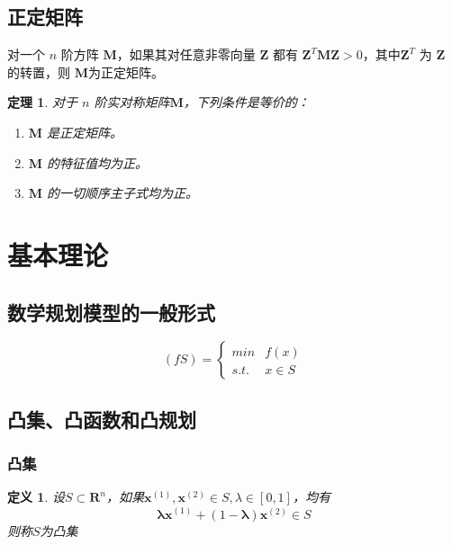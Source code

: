 \documentclass{book}
\newtheorem{theorem}{定理}[chapter]
\newtheorem{definition}{\indent 定义}[chapter]
\begin{document}
\subsection{正定矩阵}

对一个 $n$ 阶方阵 $\boldsymbol{M}$，如果其对任意非零向量 $\boldsymbol{Z}$ 都有 $\boldsymbol{Z}^T\boldsymbol{MZ}>0$，其中$\boldsymbol{Z}^T$ 为 $\boldsymbol{Z}$ 的转置，则 $\boldsymbol{M}$为正定矩阵。
\begin{theorem}
    对于 $n$ 阶实对称矩阵$\boldsymbol{M}$，下列条件是等价的：
    \begin{enumerate}
        \item $\boldsymbol{M}$ 是正定矩阵。
        \item $\boldsymbol{M}$ 的特征值均为正。
        \item $\boldsymbol{M}$ 的一切顺序主子式均为正。
    \end{enumerate}
\end{theorem}

\section{基本理论}
\subsection{数学规划模型的一般形式}

\begin{equation}
    (fS) = \begin{cases}
        min  & f(x)    \\
        s.t. & x \in S
    \end{cases}
    \label{con:general form}
\end{equation}

\subsection{凸集、凸函数和凸规划}
\subsubsection{凸集}

\begin{definition}
    设$S \subset \mathbf{R}^n$，如果$\boldsymbol{x}^{(1)}, \boldsymbol{x}^{(2)} \in S, \lambda \in [0, 1]$，均有
    \begin{equation}
        \boldsymbol{\lambda x}^{(1)}+(1-\boldsymbol{\lambda})\boldsymbol{x}^{(2)} \in S
    \end{equation}
    则称$S$为凸集
\end{definition}
\end{document}
